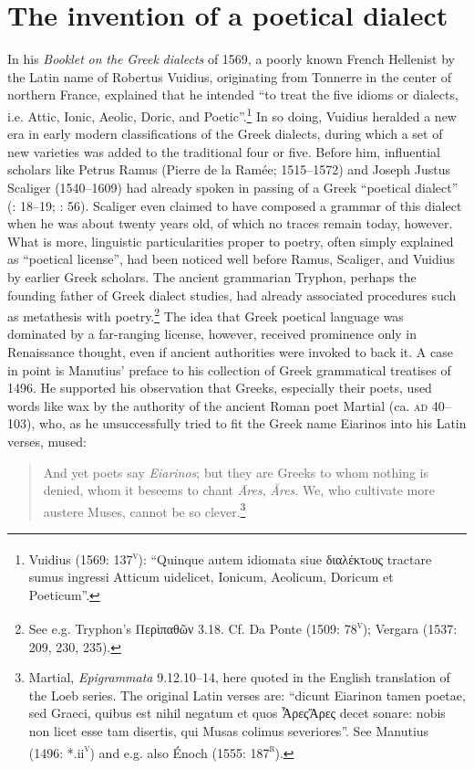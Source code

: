 \section{The invention of a poetical dialect}

In his \textit{Booklet} \textit{on} \textit{the} \textit{Greek} \textit{dialects} of 1569, a poorly known French Hellenist by the Latin name of Robertus Vuidius, originating from Tonnerre in the center of northern France, explained that he intended “to treat the five idioms or dialects, i.e. Attic, Ionic, Aeolic, Doric, and Poetic”.\footnote{Vuidius (1569: 137\textsc{\textsuperscript{v}}): “Quinque autem idiomata siue διαλέκτoυς tractare sumus ingressi Atticum uidelicet, Ionicum, Aeolicum, Doricum et Poeticum”.} In so doing, Vuidius heralded a new era in early modern classifications of the Greek dialects, during which a set of new varieties was added to the traditional four or five. Before him, influential scholars like Petrus Ramus (Pierre de la Ramée; 1515–1572) and Joseph Justus Scaliger (1540–1609) had already spoken in passing of a Greek “poetical dialect” (\citealt{Ramus1560}: 18–19; \citealt{Scaliger1594}: 56). Scaliger even claimed to have composed a grammar of this dialect when he was about twenty years old, of which no traces remain today, however. What is more, linguistic particularities proper to poetry, often simply explained as “poetical license”, had been noticed well before Ramus, Scaliger, and Vuidius by earlier Greek scholars. The ancient grammarian Tryphon, perhaps the founding father of Greek dialect studies, had already associated procedures such as metathesis with poetry.\footnote{See e.g. Tryphon’s Περὶπαθῶν 3.18. Cf. Da Ponte (1509: 78\textsc{\textsuperscript{v}}); Vergara (1537: 209, 230, 235).} The idea that Greek poetical language was dominated by a far-ranging license, however, received prominence only in Renaissance thought, even if ancient authorities were invoked to back it. A case in point is Manutius’ preface to his collection of Greek grammatical treatises of 1496. He supported his observation that Greeks, especially their poets, used words like wax by the authority of the ancient Roman poet Martial (ca. \textsc{ad} 40–103), who, as he unsuccessfully tried to fit the Greek name Eiarinos into his Latin verses, mused:

\begin{quote}
And yet poets say \textit{Eiarinos}; {\textbar} but they are Greeks to whom nothing is denied, {\textbar} whom it beseems to chant \textit{Āres}, \textit{Ăres}. {\textbar} We, who cultivate more austere Muses, {\textbar} cannot be so clever.\footnote{Martial, \textit{Epigrammata} 9.12.10–14, here quoted in the English translation of the Loeb series. The original Latin verses are: “dicunt Eiarinon tamen poetae, {\textbar} sed Graeci, quibus est nihil negatum {\textbar} et quos ἎρεςἌρες decet sonare: {\textbar} nobis non licet esse tam disertis, {\textbar} qui Musas colimus severiores”. See Manutius (1496: *.ii\textsc{\textsuperscript{v}}) and e.g. also Énoch (1555: 187\textsc{\textsuperscript{r}}).}
\end{quote}

